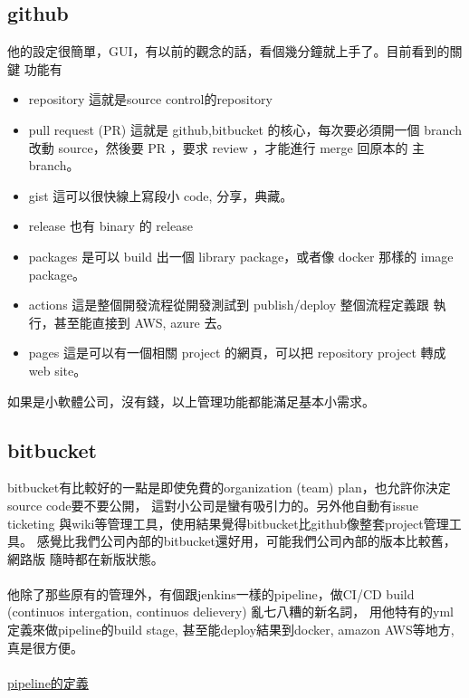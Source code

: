  \subsection{github}
  他的設定很簡單，GUI，有以前的觀念的話，看個幾分鐘就上手了。目前看到的關鍵
  功能有
  \begin{itemize}
    \item repository 這就是source control的repository
    \item pull request (PR) 這就是 github,bitbucket 的核心，每次要必須開一個
      branch 改動 source，然後要 PR ，要求 review ，才能進行 merge 回原本的
      主 branch。
    \item gist 這可以很快線上寫段小 code, 分享，典藏。
    \item release 也有 binary 的 release
    \item packages 是可以 build 出一個 library package，或者像 docker 那樣的
      image package。
    \item actions 這是整個開發流程從開發測試到 publish/deploy 整個流程定義跟
      執行，甚至能直接到 AWS, azure 去。
    \item pages 這是可以有一個相關 project 的網頁，可以把 repository project
      轉成 web site。
  \end{itemize}
  如果是小軟體公司，沒有錢，以上管理功能都能滿足基本小需求。

  \subsection{bitbucket}
  bitbucket有比較好的一點是即使免費的organization (team) plan，也允許你決定
  source code要不要公開， 這對小公司是蠻有吸引力的。另外他自動有issue ticketing
  與wiki等管理工具，使用結果覺得bitbucket比github像整套project管理工具。
  感覺比我們公司內部的bitbucket還好用，可能我們公司內部的版本比較舊，網路版
  隨時都在新版狀態。
  \\\\
  他除了那些原有的管理外，有個跟jenkins一樣的pipeline，做CI/CD build
  (continuos intergation, continuos delievery) 亂七八糟的新名詞，
  用他特有的yml定義來做pipeline的build stage, 甚至能deploy結果到docker,
  amazon AWS等地方, 真是很方便。
  \\\\
  \href{https://confluence.atlassian.com/bitbucket/build-test-and-deploy-with-pipelines-792496469.html}
  {pipeline的定義}

